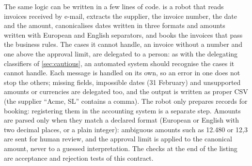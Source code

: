 The same logic can be written in a few lines of code.  is a robot that reads invoices
received by e-mail, extracts the supplier, the invoice number, the date and the amount, canonicalises
dates written in three formats and amounts written with European and English separators, and books the
invoices that pass the business rules. The cases it cannot handle, an invoice without a number and one
above the approval limit, are delegated to a person: as with the delegating classifiers of
\cref{sec:cautious}, an automated system should recognise the cases it cannot handle. Each message is handled on its own, so an error in one does not stop the others; missing
fields, impossible dates (31 February) and unsupported amounts or currencies are delegated too, and the
output is written as proper CSV (the supplier ``Acme, SL'' contains a comma). The robot only prepares
records for booking: registering them in the accounting system is a separate step. Amounts are parsed only when they
match a declared format (European or English with two decimal places, or a plain integer): ambiguous amounts such as
12.480 or 12,3 are sent for human review, and the approval limit is applied to the canonical amount, never to a guessed
interpretation. The checks at the end of the listing are acceptance and rejection tests of this contract.

